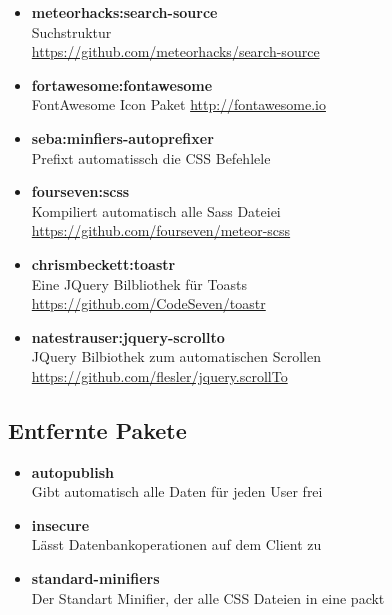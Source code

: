 \documentclass[Info_VK_Website_Dokumentation.tex]{subfiles}
\begin{document}
\begin{itemize}
 	\item \textbf{meteorhacks:search-source}\\
 	Suchstruktur \\
 	\small \url{https://github.com/meteorhacks/search-source}

 	\item \textbf{fortawesome:fontawesome}\\
 	FontAwesome Icon Paket
 	\small \url{http://fontawesome.io} 

 	\item \textbf{seba:minfiers-autoprefixer}\\
 	Prefixt automatissch die CSS Befehlele

 	\item \textbf{fourseven:scss}\\
 	Kompiliert automatisch alle Sass Dateiei \\
 	\small \url{https://github.com/fourseven/meteor-scss} 

 	\item \textbf{chrismbeckett:toastr}\\
 	Eine JQuery Bilbliothek für Toasts \\
 	\small \url{https://github.com/CodeSeven/toastr} 

 	\item \textbf{natestrauser:jquery-scrollto}\\
 	JQuery Bilbiothek zum automatischen Scrollen \\
 	\small \url{https://github.com/flesler/jquery.scrollTo} 

 \end{itemize} 

\subsection{Entfernte Pakete}

\begin{itemize}
 	\item \textbf{autopublish}\\
 	Gibt automatisch alle Daten für jeden User frei
 	\item \textbf{insecure}\\
 	Lässt Datenbankoperationen auf dem Client zu
 	\item \textbf{standard-minifiers}\\
 	Der Standart Minifier, der alle CSS Dateien in eine packt
 \end{itemize} 
\end{document}
